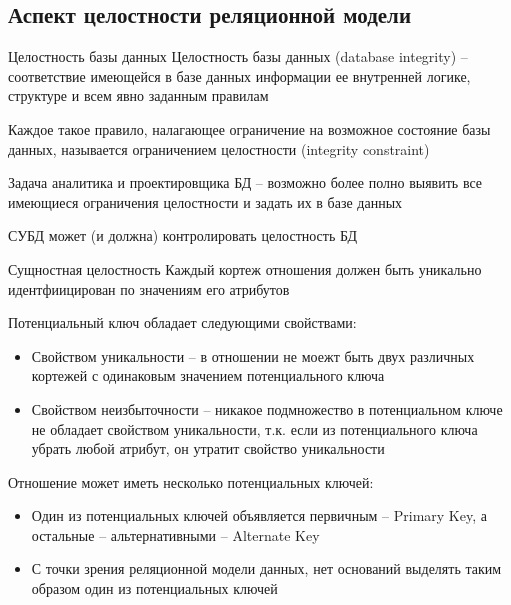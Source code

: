 \documentclass[12pt]{article}
\begin{document}
\newpage

\subsection{Аспект целостности реляционной модели}

\begin{defin}{Целостность базы данных}
    Целостность базы данных (database integrity) -- соответствие имеющейся в базе данных информации ее внутренней логике, структуре и всем явно заданным правилам 

    Каждое такое правило, налагающее ограничение на возможное состояние базы данных, называется ограничением целостности (integrity constraint)

    Задача аналитика и проектировщика БД -- возможно более полно выявить все имеющиеся ограничения целостности и задать их в базе данных 

    СУБД может (и должна) контролировать целостность БД
\end{defin}

\begin{nota}{Сущностная целостность}
    Каждый кортеж отношения должен быть уникально идентфиицирован по значениям его атрибутов

    Потенциальный ключ обладает следующими свойствами:

    \begin{itemize}
        \item Свойством уникальности -- в отношении не моежт быть двух различных кортежей с одинаковым значением потенциального ключа
        \item Свойством неизбыточности -- никакое подмножество в потенциальном ключе не обладает свойством уникальности, т.к. если из потенциального ключа убрать любой атрибут, он утратит свойство уникальности
    \end{itemize}

    Отношение может иметь несколько потенциальных ключей:

    \begin{itemize}
        \item Один из потенциальных ключей объявляется первичным -- Primary Key, а остальные -- альтернативными -- Alternate Key
        \item С точки зрения реляционной модели данных, нет оснований выделять таким образом один из потенциальных ключей 
    \end{itemize}
\end{nota}
\end{document}
